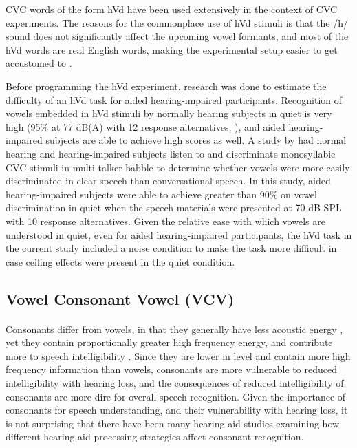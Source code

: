 CVC words of the form hVd have been used extensively in the context of CVC experiments.  The reasons for the commonplace use of hVd stimuli is that the /h/ sound does not significantly affect the upcoming vowel formants, and most of the hVd words are real English words, making the experimental setup easier to get accustomed to \cite{Potter1950}.

Before programming the hVd experiment, research was done to estimate the difficulty of an hVd task for aided hearing-impaired participants.  Recognition of vowels embedded in hVd stimuli by normally hearing subjects in quiet is very high (95\% at 77 dB(A) with 12 response alternatives; ), and aided hearing-impaired subjects are able to achieve high scores as well.  A study by  had normal hearing and hearing-impaired subjects listen to and discriminate monosyllabic CVC stimuli in multi-talker babble to determine whether vowels were more easily discriminated in clear speech than conversational speech.  In this study, aided hearing-impaired subjects were able to achieve greater than 90\% on vowel discrimination in quiet when the speech materials were presented at 70 dB SPL with 10 response alternatives.  Given the relative ease with which vowels are understood in quiet, even for aided hearing-impaired participants, the hVd task in the current study included a noise condition to make the task more difficult in case ceiling effects were present in the quiet condition.


\subsection{Vowel Consonant Vowel (VCV)}
\paragraph{}Consonants differ from vowels, in that they generally have less acoustic energy \cite{Hamill2008}, yet they contain proportionally greater high frequency energy, and contribute more to speech intelligibility \cite{Hamill2008}.  Since they are lower in level and contain more high frequency information than vowels, consonants are more vulnerable to reduced intelligibility with hearing loss, and the consequences of reduced intelligibility of consonants are more dire for overall speech recognition.  Given the importance of consonants for speech understanding, and their vulnerability with hearing loss, it is not surprising that there have been many hearing aid studies examining how different hearing aid processing strategies affect consonant recognition.

